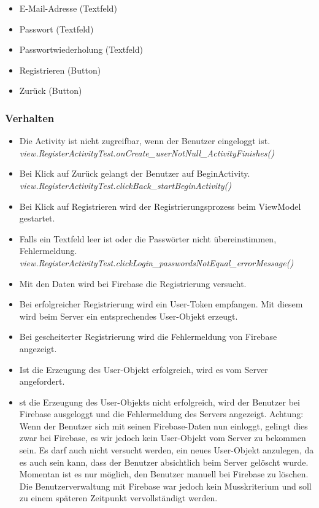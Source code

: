 \documentclass[a4paper]{scrreprt}
\begin{document}
\begin{itemize}
\item E-Mail-Adresse (Textfeld)
\item Passwort (Textfeld)
\item Passwortwiederholung (Textfeld)
\item Registrieren (Button)
\item Zurück (Button)
\end{itemize}

\subsubsection{Verhalten}

\begin{itemize}
\item Die Activity ist nicht zugreifbar, wenn der Benutzer eingeloggt ist. \\
\textit{view.RegisterActivityTest.onCreate\_userNotNull\_ActivityFinishes()}
\item Bei Klick auf Zurück gelangt der Benutzer auf BeginActivity.\\
\textit{view.RegisterActivityTest.clickBack\_startBeginActivity()}
\item Bei Klick auf Registrieren wird der Registrierungsprozess beim ViewModel gestartet.
\item Falls ein Textfeld leer ist oder die Passwörter nicht übereinstimmen, Fehlermeldung.\\
\textit{view.RegisterActivityTest.clickLogin\_passwordsNotEqual\_errorMessage()}
\item Mit den Daten wird bei Firebase die Registrierung versucht.
\item Bei erfolgreicher Registrierung wird ein User-Token empfangen. Mit diesem wird beim Server ein entsprechendes User-Objekt erzeugt. 
\item Bei gescheiterter Registrierung wird die Fehlermeldung von Firebase angezeigt.
\item Ist die Erzeugung des User-Objekt erfolgreich, wird es vom Server angefordert.
\item st die Erzeugung des User-Objekts nicht erfolgreich, wird der Benutzer bei Firebase ausgeloggt und die Fehlermeldung des Servers angezeigt. 
Achtung: Wenn der Benutzer sich mit seinen Firebase-Daten nun einloggt, gelingt dies zwar bei Firebase, es wir jedoch kein User-Objekt vom Server zu bekommen sein. Es darf auch nicht versucht werden, ein neues User-Objekt anzulegen, da es auch sein kann, dass der Benutzer absichtlich beim Server gelöscht wurde. Momentan ist es nur möglich, den Benutzer manuell bei Firebase zu löschen. Die Benutzerverwaltung mit Firebase war jedoch kein Musskriterium und soll zu einem späteren Zeitpunkt vervollständigt werden.  

\end{itemize}
\end{document}
